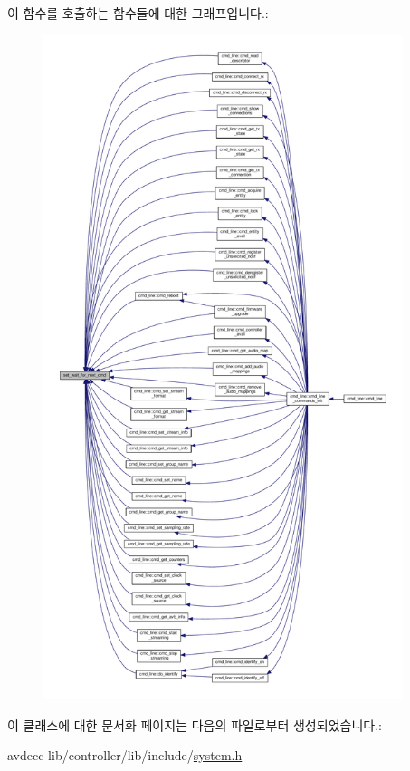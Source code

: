 이 함수를 호출하는 함수들에 대한 그래프입니다.\+:
\nopagebreak
\begin{figure}[H]
\begin{center}
\leavevmode
\includegraphics[height=550pt]{classavdecc__lib_1_1system_a26b769584f10225077da47583edda33e_icgraph}
\end{center}
\end{figure}




이 클래스에 대한 문서화 페이지는 다음의 파일로부터 생성되었습니다.\+:\begin{DoxyCompactItemize}
\item 
avdecc-\/lib/controller/lib/include/\hyperlink{system_8h}{system.\+h}\end{DoxyCompactItemize}
